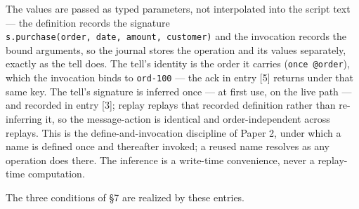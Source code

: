 \documentclass[
]{article}
\let\origtexttt\texttt%
\renewcommand{\texttt}[1]{\origtexttt{\seqsplit{#1}}}%
\let\texttt\origtexttt%
\begin{document}
The values are passed as typed parameters, not interpolated into the
script text --- the definition records the signature
\texttt{s.purchase(order,\ date,\ amount,\ customer)} and the invocation
records the bound arguments, so the journal stores the operation and its
values separately, exactly as the tell does. The tell's identity is the
order it carries (\texttt{once\ @order}), which the invocation binds to
\texttt{\textquotesingle{}ord-100\textquotesingle{}} --- the ack in
entry {[}5{]} returns under that same key. The tell's signature is
inferred once --- at first use, on the live path --- and recorded in
entry {[}3{]}; replay replays that recorded definition rather than
re-inferring it, so the message-action is identical and
order-independent across replays. This is the define-and-invocation
discipline of Paper 2, under which a name is defined once and thereafter
invoked; a reused name resolves as any operation does there. The
inference is a write-time convenience, never a replay-time computation.

The three conditions of §7 are realized by these entries.
\end{document}
